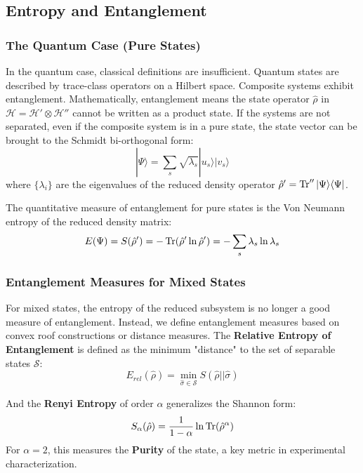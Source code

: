 \documentclass[11pt,a4paper]{article}
\theoremstyle{definition}
\begin{document}
\subsection{Entropy and Entanglement}

\subsubsection{The Quantum Case (Pure States)}

In the quantum case, classical definitions are insufficient. Quantum states are described by trace-class operators on a Hilbert space. Composite systems exhibit entanglement. Mathematically, entanglement means the state operator $\hat{\rho}$ in $\mathcal{H} = \mathcal{H}' \otimes \mathcal{H}''$ cannot be written as a product state.
If the systems are not separated, even if the composite system is in a pure state, the state vector can be brought to the Schmidt bi-orthogonal form:
\begin{equation}
    |\Psi\rangle = \sum_s \sqrt{\lambda_s} |u_s\rangle |v_s\rangle
\end{equation}
where $\{\lambda_i\}$ are the eigenvalues of the reduced density operator $\hat{\rho}' = \Tr'' |\Psi\rangle\langle\Psi|$.

The quantitative measure of entanglement for pure states is the Von Neumann entropy of the reduced density matrix:
\begin{equation}
    E(\Psi) = S(\hat{\rho}') = -\Tr(\hat{\rho}' \ln \hat{\rho}') = - \sum_s \lambda_s \ln \lambda_s
\end{equation}

\subsubsection{Entanglement Measures for Mixed States}
For mixed states, the entropy of the reduced subsystem is no longer a good measure of entanglement. Instead, we define entanglement measures based on convex roof constructions or distance measures.
The \textbf{Relative Entropy of Entanglement} is defined as the minimum "distance" to the set of separable states $\mathcal{S}$:
\begin{equation}
    E_{rel}(\hat{\rho}) = \min_{\hat{\sigma} \in \mathcal{S}} S(\hat{\rho} || \hat{\sigma})
\end{equation}

And the \textbf{Renyi Entropy} of order $\alpha$ generalizes the Shannon form:
\begin{equation}
    S_\alpha(\hat{\rho}) = \frac{1}{1-\alpha} \ln \Tr(\hat{\rho}^\alpha)
\end{equation}
For $\alpha=2$, this measures the \textbf{Purity} of the state, a key metric in experimental characterization.
\end{document}
